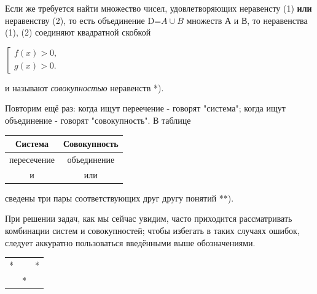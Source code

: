 Если же требуется найти множество чисел, удовлетворяющих неравенсту (1) \textbf{или} неравенству (2), то есть объединение D=$A\cup B$ множеств А и В, то неравенства (1), (2) соединяют квадратной скобкой

\begin{center}

$\left[ 
  \begin{gathered}
    f(x) > 0,\\
    g(x) > 0.
  \end{gathered}
\right.$
    
\end{center}

\noindent и называют \textit{совокупностью} неравенств *).
\let\thefootnote\relax{}

Повторим ещё раз: когда ищут переечение - говорят "система"; когда ищут объединение - говорят "совокупность". В таблице

\begin{center}
\def\arraystretch{2}%
\begin{tabular}{ | c | c | } 
\hline
 Система & Совокупность \\ 
\hline
 пересечение  & объединение \\ 
\hline
 и  & или \\
 \hline
\end{tabular}
\end{center}

\noindent сведены три пары соответствующих друг другу понятий **).

При решении задач, как мы сейчас увидим, часто приходится рассматривать комбинации систем и совокупностей; чтобы избегать в таких случаях ошибок, следует аккуратно пользоваться введёнными выше обозначениями.

\begin{center}
\vspace*{-2mm}
\begin{tabular}{ l l l }
 * &   & * \\ 
   & * &   \\ 
\end{tabular}
\vspace*{-\baselineskip}
\end{center}

